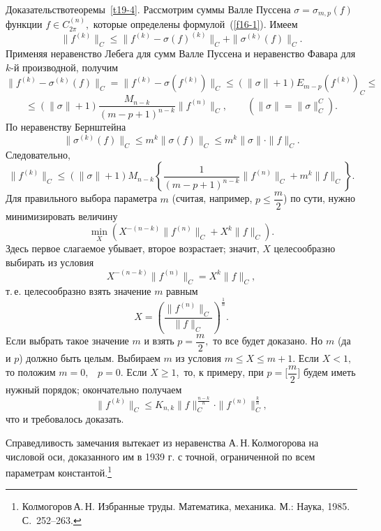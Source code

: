  Д\;о\;к\;а\;з\;а\;т\;е\;л\;ь\;с\;т\;в\;о\quad теоремы~\ref{t19-4}.
 Рассмотрим  суммы Валле Пуссена $\sigma=\sigma_{m,p}(f)$ функции $f\in C^{(n)}_{2\pi},$
 которые определены формулой~{(\ref{f16-1}).}
 Имеем
 $$
 \|f^{(k)}\|_C\le \|f^{(k)}-\sigma(f)^{(k)}\|_C+\|\sigma^{(k)}(f)\|_C.
 $$
 Применяя неравенство Лебега для сумм Валле Пуссена и неравенство Фавара
 для $k$-й производной, получим
 $$
 \|f^{(k)}-\sigma^{(k)}(f)\|_C= \|f^{(k)}-\sigma(f^{(k)})\|_C\le (\|\sigma\|+1)
 E_{m-p}(f^{(k)})_C\le
 $$
 $$
 \le (\|\sigma\|+1) {\frac{M_{n-k}}{(m-p+1)^{n-k}}} \|f^{(n)}\|_C,
 \qquad {(\|\sigma\|=\|\sigma\|_C^C).}
 $$
 По неравенству Бернштейна
 $$
 \|\sigma^{(k)}(f)\|_C\le m^k \|\sigma(f)\|_C\le m^k \|\sigma\|\cdot
 \|f\|_C.
 $$
 Следовательно,
 $$
 \|f^{(k)}\|_C\le (\|\sigma\|+1) M_{{n-k}} \left\{ \frac{1}{(m-p+1)^{n-k}}
 \|f^{(n)}\|_C+m^k \|f\|_C \right\}.
 $$
 Для правильного выбора параметра $m$ (считая, например, $p\le \dfrac{m}{2}$)
 по сути, нужно минимизировать  величину
 $$
 \min_{X}\left( X^{-(n-k)} \|f^{(n)}\|_C+X^k\|f\|_C\right).
 $$
 Здесь первое слагаемое убывает, второе возрастает;
 значит, $X$ целесообразно выбирать из условия
 $$
 X^{-(n-k)}\|f^{(n)}\|_C=X^k\|f\|_C,
 $$
 т.\,е. целесообразно взять значение $m$ равным
 $$
 X=\left( \frac{\|f^{(n)}\|_C}{\|f\|_C} \right)^{\frac{1}{n}}.
 $$
 Если выбрать такое значение $m$  и взять  $p=\dfrac{m}{2},$ то все будет доказано. Но $m$ (да и $p$)
 должно быть целым. Выбираем $m$ из условия $m\le X\le m+1.$
 Если $X<1,$ то положим $m=0,$~ $p=0.$
 Если $X\ge 1,$ то, к примеру, при $p=\Big[\dfrac{m}{2}\Big]$ будем иметь нужный порядок;
 окончательно получаем
 $$
 \|f^{(k)}\|_C\le K_{n,k} \|f\|_C^{\frac{n-k}{n}}\cdot
 \|f^{(n)}\|_C^{\frac{k}{n}},
 $$
 что и требовалось доказать.

 Справедливость замечания вытекает из неравенства
 А.\,Н.\,Колмогорова на числовой оси, доказанного им в 1939 г. с точной,
 ограниченной по всем параметрам константой.\footnote{Колмогоров\,А.\,Н.
 Избранные труды. Математика, механика. М.: Наука, 1985. С.~252--263.}
